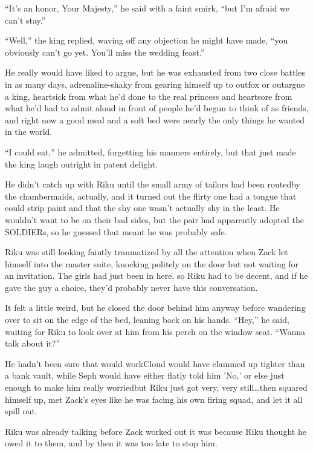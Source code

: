``It's an honor, Your Majesty,'' he said with a faint smirk, ``but I'm afraid we can't stay.''

``Well,'' the king replied, waving off any objection he might have made, ``you obviously can't go yet. You'll miss the wedding feast.''

He really would have liked to argue, but he was exhausted from two close battles in as many days, adrenaline-shaky from gearing himself up to outfox or outargue a king, heartsick from what he'd done to the real princess and heartsore from what he'd had to admit aloud in front of people he'd begun to think of as friends, and right now a good meal and a soft bed were nearly the only things he wanted in the world.

``I could eat,'' he admitted, forgetting his manners entirely, but that just made the king laugh outright in patent delight.


\scenechange


He didn't catch up with Riku until the small army of tailors had been routed\textemdash by the chambermaids, actually, and it turned out the flirty one had a tongue that could strip paint and that the shy one wasn't actually shy in the least. He wouldn't want to be on their bad sides, but the pair had apparently adopted the SOLDIERs, so he guessed that meant he was probably safe.

Riku was still looking faintly traumatized by all the attention when Zack let himself into the master suite, knocking politely on the door but not waiting for an invitation. The girls had just been in here, so Riku had to be decent, and if he gave the guy a choice, they'd probably never have this conversation.

It felt a little weird, but he closed the door behind him anyway before wandering over to sit on the edge of the bed, leaning back on his hands. ``Hey,'' he said, waiting for Riku to look over at him from his perch on the window seat. ``Wanna talk about it?''

He hadn't been sure that would work\textemdash Cloud would have clammed up tighter than a bank vault, while Seph would have either flatly told him 'No,' or else just enough to make him really worried\textemdash but Riku just got very, very still\ldots then squared himself up, met Zack's eyes like he was facing his own firing squad, and let it all spill out.

Riku was already talking before Zack worked out it was because Riku thought he owed it to them, and by then it was too late to stop him.

